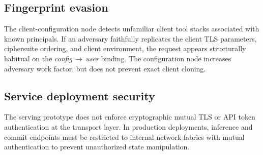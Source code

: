 \subsection{Fingerprint evasion}

The client-configuration node detects unfamiliar client tool stacks associated with known
principals. If an adversary faithfully replicates the client TLS parameters,
ciphersuite ordering, and client environment, the request appears structurally habitual on the
\textit{config}\,$\rightarrow$\,\textit{user} binding. The configuration node increases adversary
work factor, but does not prevent exact client cloning.

\subsection{Service deployment security}

The serving prototype does not enforce cryptographic mutual TLS or API token authentication
at the transport layer. In production deployments, inference and commit endpoints must be
restricted to internal network fabrics with mutual authentication to prevent unauthorized
state manipulation.

